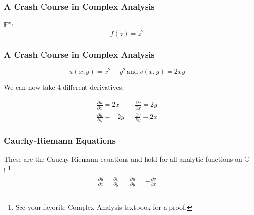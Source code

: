 \documentclass{beamer}
\def\C{\mathbb{C}}                     %
\begin{document}
\begin{frame}
\frametitle{A Crash Course in Complex Analysis}

$\mathbb{E}^x$:
\[ f(z) = z^2 \]
\pause {}

\pause {}
\pause {}
\end{frame}

\begin{frame}
\frametitle{A Crash Course in Complex Analysis}

\[ u(x,y) = x^2 - y^2 \ \mathrm{and} \ v(x,y) = 2xy \]

We can now take 4 different derivatives.

\begin{eqnarray*}
\frac{\partial u}{\partial x} = 2x && \frac{\partial v}{\partial x} = 2y \\
\frac{\partial u}{\partial y} = -2y && \frac{\partial v}{\partial y} = 2x
\end{eqnarray*}

\pause {}
\end{frame}

\begin{frame}
\frametitle{Cauchy-Riemann Equations}
  These are the Cauchy-Riemann equations and hold for all analytic functions on $\C$! \footnote{See your favorite Complex Analysis textbook for a proof.}
  \begin{eqnarray*}
  \frac{\partial u}{\partial x} = \frac{\partial v}{\partial y} &&
  \frac{\partial u}{\partial y} = -\frac{\partial v}{\partial x}
  \end{eqnarray*}



\end{frame}
\end{document}
